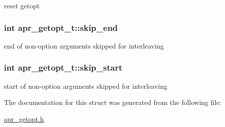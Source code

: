 reset getopt \hypertarget{structapr__getopt__t_ae9e7e6eb1576820c7dc6e589cc3a28b7}{
\subsubsection[{skip\-\_\-end}]{\setlength{\rightskip}{0pt plus 5cm}int apr\-\_\-getopt\-\_\-t\-::skip\-\_\-end}}\label{structapr__getopt__t_ae9e7e6eb1576820c7dc6e589cc3a28b7}
end of non-\/option arguments skipped for interleaving \hypertarget{structapr__getopt__t_a0cd41eedf9ed82bf5d9dcc3491ee67dd}{
\subsubsection[{skip\-\_\-start}]{\setlength{\rightskip}{0pt plus 5cm}int apr\-\_\-getopt\-\_\-t\-::skip\-\_\-start}}\label{structapr__getopt__t_a0cd41eedf9ed82bf5d9dcc3491ee67dd}
start of non-\/option arguments skipped for interleaving 

The documentation for this struct was generated from the following file\-:\begin{DoxyCompactItemize}
\item 
\hyperlink{apr__getopt_8h}{apr\-\_\-getopt.\-h}\end{DoxyCompactItemize}
